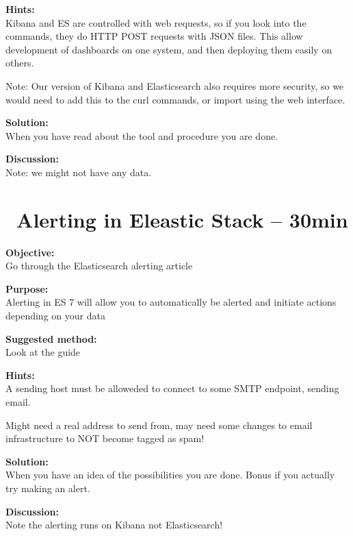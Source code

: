\documentclass[a4paper,11pt,notitlepage]{report}
\begin{document}
{\bf Hints:}\\
Kibana and ES are controlled with web requests, so if you look into the commands, they do HTTP POST requests with JSON files. This allow development of dashboards on one system, and then deploying them easily on others.

Note: Our version of Kibana and Elasticsearch also requires more security, so we would need to add this to the curl commands, or import using the web interface.

{\bf Solution:}\\
When you have read about the tool and procedure you are done.

{\bf Discussion:}\\
Note: we might not have any data.



\chapter{\faInfoCircle\ Alerting in Eleastic Stack -- 30min}
\label{ex:es7-alerting}


{\bf Objective:}\\
Go through the Elasticsearch alerting article

{\bf Purpose:}\\
Alerting in ES 7 will allow you to automatically be alerted and initiate actions depending on your data


{\bf Suggested method:}\\
Look at the guide



{\bf Hints:}\\
A sending host must be alloweded to connect to some SMTP endpoint, sending email.

Might need a real address to send from, may need some changes to email infrastructure to NOT become tagged as spam!



{\bf Solution:}\\
When you have an idea of the possibilities you are done. Bonus if you actually try making an alert.

{\bf Discussion:}\\
Note the alerting runs on Kibana not Elasticsearch!
\end{document}
